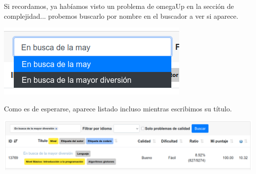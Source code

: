 \documentclass{beamer}
\begin{document}
    \begin{frame}[noframenumbering]
        Si recordamos, ya habíamos visto un problema de omegaUp en la sección de complejidad... \pause probemos buscarlo por nombre en el buscador a ver si aparece. \pause

        \begin{center}
            \includegraphics[width=.35\linewidth]{./ou_partial_search.png}
        \end{center} \pause

        Como es de esperarse, aparece listado incluso mientras escribimos su título. \pause

        \begin{center}
            \includegraphics[width=\linewidth]{./ou_searched.png}
        \end{center} 
    \end{frame}
\end{document}
